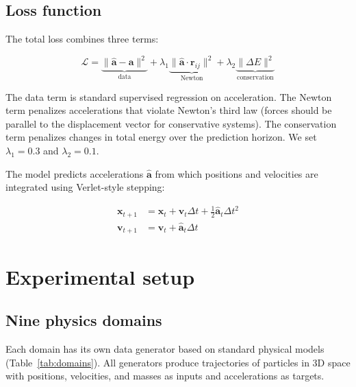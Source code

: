 \documentclass[10pt,twocolumn]{article}
\begin{document}
\subsection{Loss function}

The total loss combines three terms:

\begin{equation}
    \mathcal{L} = \underbrace{\|\hat{\mathbf{a}} - \mathbf{a}\|^2}_{\text{data}} + \lambda_1 \underbrace{\|\hat{\mathbf{a}} \cdot \mathbf{r}_{ij}\|^2}_{\text{Newton}} + \lambda_2 \underbrace{\|\Delta E\|^2}_{\text{conservation}}
\end{equation}

The data term is standard supervised regression on acceleration. The Newton term penalizes accelerations that violate Newton's third law (forces should be parallel to the displacement vector for conservative systems). The conservation term penalizes changes in total energy over the prediction horizon. We set $\lambda_1 = 0.3$ and $\lambda_2 = 0.1$.

The model predicts accelerations $\hat{\mathbf{a}}$ from which positions and velocities are integrated using Verlet-style stepping:

\begin{align}
    \mathbf{x}_{t+1} &= \mathbf{x}_t + \mathbf{v}_t \Delta t + \frac{1}{2}\hat{\mathbf{a}}_t \Delta t^2 \\
    \mathbf{v}_{t+1} &= \mathbf{v}_t + \hat{\mathbf{a}}_t \Delta t
\end{align}

\section{Experimental setup}

\subsection{Nine physics domains}

Each domain has its own data generator based on standard physical models (Table~\ref{tab:domains}). All generators produce trajectories of particles in 3D space with positions, velocities, and masses as inputs and accelerations as targets.
\end{document}
